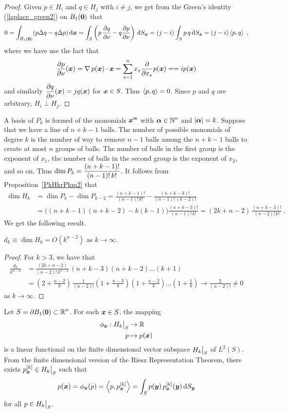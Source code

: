 \begin{proof}
Given $p\in H_i$ and $q \in H_j$ with $i \neq j$, we get from the Green's
identity (\ref{laplace_green2}) on $B_1(\VEC{0})$ that
\[
  0 = \int_{B_1(\VEC{0})} (p \Delta q - q \Delta p) \dx{\VEC{x}}
= \int_S \left( p\,\pdydx{q}{\nu} - q \pdydx{p}{\nu} \right)
\dss{S}{x} = (j - i) \int_S p\,q \dss{S}{x}
= (j-i)\ps{p}{q} \ ,
\]
where we have use the fact that
\[
 \pdydx{p}{\nu}(\VEC{x})
 = \graD p(\VEC{x}) \cdot \VEC{x}
 = \sum_{s=1}^n x_s \pdfdx{p}{x_s}(\VEC{x}) = 
 = i p(\VEC{x})
\]
and similarly $\DS \pdydx{q}{\nu}(\VEC{x}) = j q(\VEC{x})$
for $\VEC{x} \in S$.  Thus $\ps{p}{q} = 0$.  Since $p$ and $q$ are
arbitrary, $H_i \perp H_j$.
\end{proof}

A basis of $P_k$ is formed of the monomials
$\DS \VEC{x}^{\VEC{\alpha}}$ with
$\DS \VEC{\alpha} \in \NN^n$ and $|\VEC{\alpha}| = k$.
Suppose that we have a line of $n+k-1$ balls.  The number of possible
monomials of degree $k$ is the number of way to remove $n-1$ balls among the
$n+k-1$ balls to create at most $n$ groups of balls.  The number of
balls in the first group is the exponent of $x_1$, the number of balls
in the second group is the exponent of $x_2$, and so on.  Thus
$\DS \dim P_k = \frac{(n+k-1)!}{(n-1)!\,k!}$.  It follows
from Proposition~\ref{PkHkrPkm2} that
\begin{align*}
\dim H_k &= \dim P_k - \dim P_{k-2}
= \frac{(n+k-1)!}{(n-1)!\,k!} - \frac{(n+k-3)!}{(n-1)!\,(k-2)!} \\
&= \big((n+k-1)(n+k-2) - k(k-1)\big)
\frac{(n+k-3)!}{(n-1)!\,k!}
= (2k + n - 2)\, \frac{(n+k-3)!}{(n-2)!\,k!} \ .
\end{align*}
We get the following result.

\begin{prop} \label{HkOknm2}
$d_k \equiv \dim H_k = O(k^{n-2})$ as $k \to \infty$.
\end{prop}

\begin{proof}
For $k>3$, we have that
\begin{align*}
\frac{d_k}{k^{n-2}}
&= \frac{(2k + n - 2)}{(n-2)!\,k^{n-2}}\,
(n+k-3)(n+k-2)\ldots (k+1) \\
&= \left(2 + \frac{n - 2}{k}\right)\,
\frac{1}{(n-2)!}
\left(1 + \frac{n-3}{k}\right)\left(1 + \frac{n-2}{k}\right)\ldots
\left(1 + \frac{1}{k}\right) \to \frac{2}{(n-2)!} \neq 0
\end{align*}
as $k \to \infty$.
\end{proof}

Let $\DS S = \partial B_1(\VEC{0}) \subset \RR^n$.
For each $\VEC{x} \in S$, the mapping
\begin{align*}
  \phi_{\VEC{x}}: H_k\big|_S &\to \RR \\
  p &\mapsto p(\VEC{x})
\end{align*}
is a linear functional on the finite dimensional vector subspace
$\DS H_k\big|_S$ of $L^2(S)$.  From the finite dimensional
version of the Riesz Representation Theorem, there exists
$\DS p_{\VEC{x}}^{[k]}\in H_k\big|_S$ such that 
\[
  p(\VEC{x}) = \phi_{\VEC{x}}(p) = \ps{p}{p_{\VEC{x}}^{[k]}}
  = \int_S p(\VEC{y})\,p_{\VEC{x}}^{[k]}(\VEC{y}) \dss{S}{y}
\]
for all $\DS p \in H_k\big|_S$.

